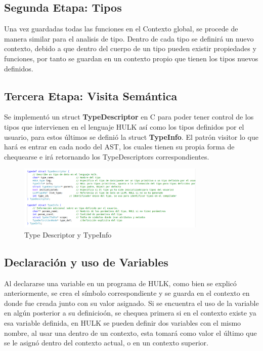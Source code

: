 \documentclass[11pt, a4paper, twoside]{article} %
\begin{document}
\subsection{Segunda Etapa: Tipos}
Una vez guardadas todas las funciones en el Contexto global, se procede de manera similar para el analisis de tipo. Dentro de cada tipo se definir\'a un nuevo contexto, 
debido a que dentro del cuerpo de un tipo pueden existir propiedades y funciones, por tanto se guardan en un contexto propio que tienen los tipos nuevos definidos. 

\subsection{Tercera Etapa: Visita Sem\'antica}
Se implement\'o un struct \textbf{TypeDescriptor} en C para poder tener control de los tipos que intervienen en el lenguaje HULK as\'i como los tipos definidos por el usuario,
para estos \'ultimos se defini\'o la struct \textbf{TypeInfo}. El patr\'on visitor lo que har\'a es entrar en cada nodo del AST, los cuales tienen su propia forma de chequearse
e ir\'a retornando los TypeDescriptors correspondientes.

\begin{figure}[h!] 
    \centering 
    \includegraphics[width=0.8\textwidth]{Types.png}
    \caption{Type Descriptor y TypeInfo}
\end{figure}

\subsection{Declaraci\'on y uso de Variables}
Al declararse una variable en un programa de HULK, como bien se explic\'o anteriormente, se crea el s\'imbolo correspondiente y se guarda en el contexto en donde fue creada 
junto con su valor asignado. Si se encuentra el uso de la variable en alg\'un posterior a su definicio\'on, se chequea primera si en el contexto existe ya esa variable definida,
en HULK se pueden definir dos variables con el mismo nombre, al usar una dentro de un contexto, esta tomar\'a como valor el \'ultimo que se le asign\'o dentro del contexto actual,
o en un contexto superior. 
\end{document}
